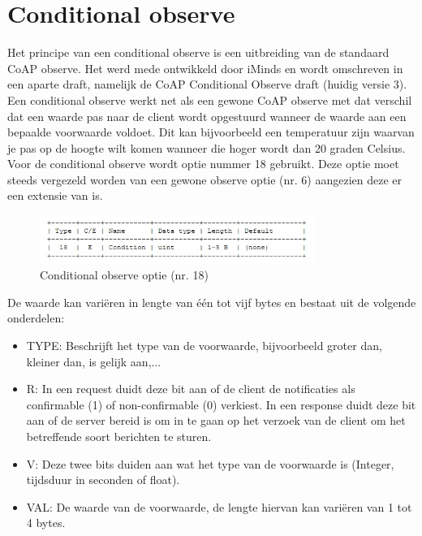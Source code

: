 \section{Conditional observe}
Het principe van een conditional observe is een uitbreiding van de standaard CoAP observe. Het werd mede ontwikkeld door iMinds en wordt omschreven in een aparte draft, namelijk de CoAP Conditional Observe draft (huidig versie 3).\\

Een conditional observe werkt net als een gewone CoAP observe met dat verschil dat een waarde pas naar de client wordt opgestuurd wanneer de waarde aan een bepaalde voorwaarde voldoet. Dit kan bijvoorbeeld een temperatuur zijn waarvan je pas op de hoogte wilt komen wanneer die hoger wordt dan 20 graden Celsius.\\
Voor de conditional observe wordt optie nummer 18 gebruikt. Deze optie moet steeds vergezeld worden van een gewone observe optie (nr. 6) aangezien deze er een extensie van is.

\begin{figure}[h!]
\label{fig:conditional}
\centering
\includegraphics[width=0.8\textwidth]{fig/conditional}
\caption{Conditional observe optie (nr. 18)}
\end{figure}

De waarde kan vari\"{e}ren in lengte van \'{e}\'{e}n tot vijf bytes en bestaat uit de volgende onderdelen:

\begin{itemize}
\item TYPE: Beschrijft het type van de voorwaarde, bijvoorbeeld groter dan, kleiner dan, is gelijk aan,...
\item R: In een request duidt deze bit aan of de client de notificaties als confirmable (1) of non-confirmable (0) verkiest. In een response duidt deze bit aan of de server bereid is om in te gaan op het verzoek van de client om het betreffende soort berichten te sturen.
\item V: Deze twee bits duiden aan wat het type van de voorwaarde is (Integer, tijdsduur in seconden of float).
\item VAL: De waarde van de voorwaarde, de lengte hiervan kan vari\"{e}ren van 1 tot 4 bytes.
\end{itemize}

